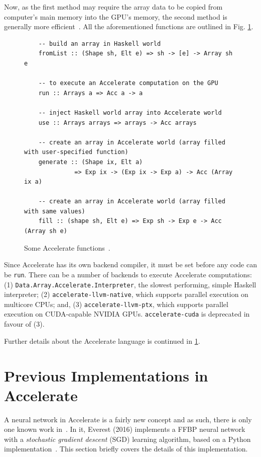 Now, as the first method may require the array data to be copied from computer's main memory into the GPU's memory, the second method is generally more efficient~\cite{Mar13}. All the aforementioned functions are outlined in Fig. \ref{fig:acc-functions}.
\begin{figure}
  \begin{lstlisting}
    -- build an array in Haskell world
    fromList :: (Shape sh, Elt e) => sh -> [e] -> Array sh e

	-- to execute an Accelerate computation on the GPU
    run :: Arrays a => Acc a -> a
    
    -- inject Haskell world array into Accelerate world
    use :: Arrays arrays => arrays -> Acc arrays
    
    -- create an array in Accelerate world (array filled with user-specified function)
    generate :: (Shape ix, Elt a) 
              => Exp ix -> (Exp ix -> Exp a) -> Acc (Array ix a)
    
    -- create an array in Accelerate world (array filled with same values)
    fill :: (shape sh, Elt e) => Exp sh -> Exp e -> Acc (Array sh e)
  \end{lstlisting}
  \caption{Some Accelerate functions~\cite{Mar13}.}
  \label{fig:acc-functions}
\end{figure}

Since Accelerate has its own backend compiler, it must be set before any code can be \texttt{run}. There can be a number of backends to execute Accelerate computations: (1) \texttt{Data.Array.Accelerate.Interpreter}, the slowest performing, simple Haskell interpreter; (2) \texttt{accelerate-llvm-native}, which supports parallel execution on multicore CPUs; and, (3) \texttt{accelerate-llvm-ptx}, which supports parallel execution on CUDA-capable NVIDIA GPUs. \texttt{accelerate-cuda} is deprecated in favour of (3).

Further details about the Accelerate language is continued in \ref{se:previmplem}.

\section{Previous Implementations in Accelerate} \label{se:previmplem}

A neural network in Accelerate is a fairly new concept and as such, there is only one known work in~\cite{Eve16}. In it, Everest (2016) implements a FFBP neural network with a \textit{stochastic gradient descent} (SGD) learning algorithm, based on a Python implementation~\cite{Nie16}. This section briefly covers the details of this implementation.

